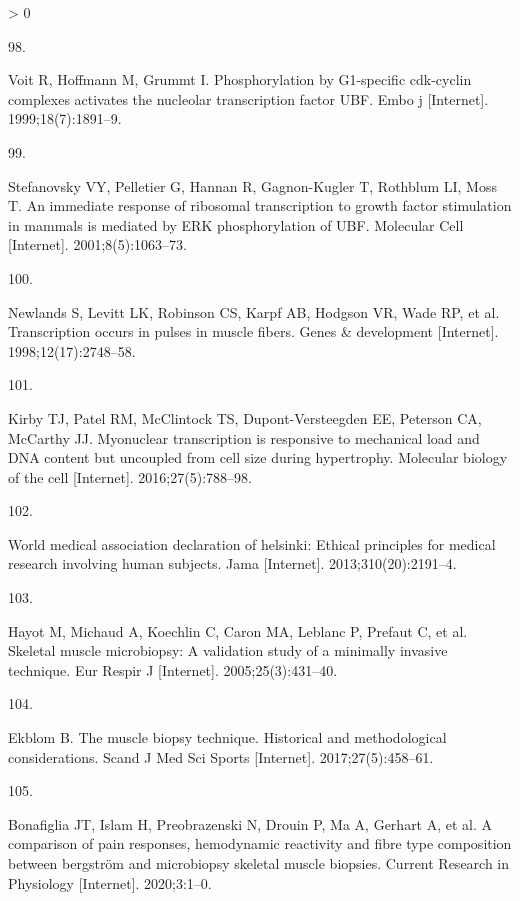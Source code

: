 \documentclass[twoside,10pt]{gihclass} %
\newlength{\cslhangindent}
\newlength{\csllabelwidth}
\newenvironment{CSLReferences}[3] %
 {%
  \setlength{\parindent}{0pt}
  \ifodd #1 \everypar{\setlength{\hangindent}{\cslhangindent}}\ignorespaces\fi
  \ifnum #2 > 0
  \setlength{\parskip}{#2\baselineskip}
  \fi
 }%
 {}
\newcommand{\CSLLeftMargin}[1]{\parbox[t]{\maxof{\widthof{#1}}{\csllabelwidth}}{#1}}
\newcommand{\CSLRightInline}[1]{\parbox[t]{\linewidth}{#1}}
\begin{document}
\begin{CSLReferences}{0}{0}
\leavevmode\hypertarget{ref-RN2602}{}%
\CSLLeftMargin{98. }
\CSLRightInline{Voit R, Hoffmann M, Grummt I. Phosphorylation by G1-specific cdk-cyclin complexes activates the nucleolar transcription factor UBF. Embo j {[}Internet{]}. 1999;18(7):1891--9. }

\leavevmode\hypertarget{ref-RN2604}{}%
\CSLLeftMargin{99. }
\CSLRightInline{Stefanovsky VY, Pelletier G, Hannan R, Gagnon-Kugler T, Rothblum LI, Moss T. An immediate response of ribosomal transcription to growth factor stimulation in mammals is mediated by ERK phosphorylation of UBF. Molecular Cell {[}Internet{]}. 2001;8(5):1063--73. }

\leavevmode\hypertarget{ref-RN2618}{}%
\CSLLeftMargin{100. }
\CSLRightInline{Newlands S, Levitt LK, Robinson CS, Karpf AB, Hodgson VR, Wade RP, et al. Transcription occurs in pulses in muscle fibers. Genes \& development {[}Internet{]}. 1998;12(17):2748--58. }

\leavevmode\hypertarget{ref-RN2616}{}%
\CSLLeftMargin{101. }
\CSLRightInline{Kirby TJ, Patel RM, McClintock TS, Dupont-Versteegden EE, Peterson CA, McCarthy JJ. Myonuclear transcription is responsive to mechanical load and DNA content but uncoupled from cell size during hypertrophy. Molecular biology of the cell {[}Internet{]}. 2016;27(5):788--98. }

\leavevmode\hypertarget{ref-RN2548}{}%
\CSLLeftMargin{102. }
\CSLRightInline{World medical association declaration of helsinki: Ethical principles for medical research involving human subjects. Jama {[}Internet{]}. 2013;310(20):2191--4. }

\leavevmode\hypertarget{ref-RN824}{}%
\CSLLeftMargin{103. }
\CSLRightInline{Hayot M, Michaud A, Koechlin C, Caron MA, Leblanc P, Prefaut C, et al. Skeletal muscle microbiopsy: A validation study of a minimally invasive technique. Eur Respir J {[}Internet{]}. 2005;25(3):431--40. }

\leavevmode\hypertarget{ref-RN2549}{}%
\CSLLeftMargin{104. }
\CSLRightInline{Ekblom B. The muscle biopsy technique. Historical and methodological considerations. Scand J Med Sci Sports {[}Internet{]}. 2017;27(5):458--61. }

\leavevmode\hypertarget{ref-RN2553}{}%
\CSLLeftMargin{105. }
\CSLRightInline{Bonafiglia JT, Islam H, Preobrazenski N, Drouin P, Ma A, Gerhart A, et al. A comparison of pain responses, hemodynamic reactivity and fibre type composition between bergström and microbiopsy skeletal muscle biopsies. Current Research in Physiology {[}Internet{]}. 2020;3:1--0. }


\end{CSLReferences}
\end{document}
